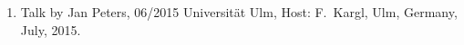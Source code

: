\begin{enumerate}
\item Talk by Jan Peters, 06/2015 Universit\"at Ulm, Host: F.~Kargl, Ulm, Germany, July, 2015.
\end{enumerate}

